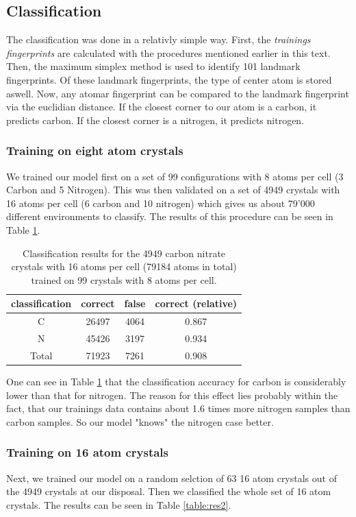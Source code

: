 \newpage
\subsection{Classification}
The classification was done in a relativly simple way. First, the \emph{trainings fingerprints} are calculated with the procedures mentioned earlier in this text. Then, the maximum simplex method is used to identify 101 landmark fingerprints. Of these landmark fingerprints, the type of center atom is stored aswell. Now, any atomar fingerprint can be compared to the landmark fingerprint via the euclidian distance. If the closest corner to our atom is a carbon, it predicts carbon. If the closest corner is a nitrogen, it predicts nitrogen.\\
\subsubsection{Training on eight atom crystals}
We trained our model first on a set of 99 configurations with 8 atoms per cell (3 Carbon and 5 Nitrogen). This was then validated on a set of 4949 crystals with 16 atoms per cell (6 carbon and 10 nitrogen) which gives us about 79'000 different environments to classify. The results of this procedure can be seen in Table \ref{table:res1}. 

\begin{table}[h!]
\center
\begin{tabular}{c|c|c|c}
classification & correct & false & correct (relative) \\ \hline
C              & 26497   & 4064  & 0.867              \\ \hline
N              & 45426   & 3197  & 0.934              \\ \hline
Total          & 71923   & 7261  & 0.908             
\end{tabular}
\caption{Classification results for the 4949 carbon nitrate crystals with 16 atoms per cell (79184 atoms in total) trained on 99 crystals with 8 atoms per cell.}
\label{table:res1}
\end{table}

One can see in Table \ref{table:res1} that the classification accuracy for carbon is considerably lower than that for nitrogen. The reason for this effect lies probably within the fact, that our trainings data contains about 1.6 times more nitrogen samples than carbon samples. So our model "knows" the nitrogen case better.

\subsubsection{Training on 16 atom crystals}
Next, we trained our model on a random selction of 63 16 atom crystals out of the 4949 crystals at our disposal. Then we classified the whole set of 16 atom crystals. The results can be seen in Table \ref{table:res2}.

